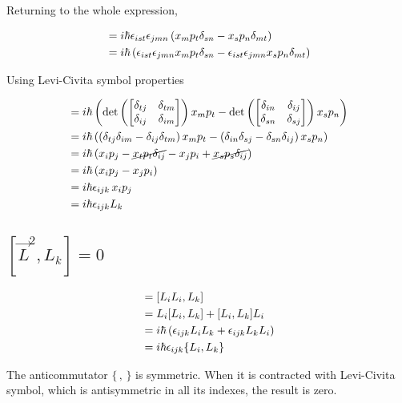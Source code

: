 Returning to the whole expression,   

\begin{align}
	[L_i,L_j] &=i\hbar\epsilon_{ist}\epsilon_{jmn} \paren{x_m p_t \delta_{sn} - x_s p_n \delta_{mt}} \\
		&=i\hbar \paren{\epsilon_{ist}\epsilon_{jmn}x_m p_t \delta_{sn} - \epsilon_{ist}\epsilon_{jmn}x_s p_n \delta_{mt}}
\end{align}

Using Levi-Civita symbol properties

\begin{align}
	[L_i,L_j] &= i\hbar\paren{\det\paren{\begin{bmatrix}
	\delta_{tj}&\delta_{tm}\\\delta_{ij}&\delta_{im}
	\end{bmatrix}}x_m p_t - \det\paren{\begin{bmatrix}
	\delta_{in}&\delta_{ij}\\\delta_{sn}&\delta_{sj}
	\end{bmatrix}}x_s p_n} \\
	&= i\hbar\paren{\paren{\delta_{tj}\delta_{im} - \delta_{ij}\delta_{tm}}x_m p_t - \paren{\delta_{in}\delta_{sj} - \delta_{sn}\delta_{ij}}x_sp_n} \\
	&= i\hbar \paren{x_i p_j - \cancel{x_tp_t\delta_{ij}} - x_jp_i + \cancel{x_s p_s\delta_{ij}}} \\
	&=  i\hbar \paren{x_i p_j -  x_jp_i } \\
	&= i\hbar \epsilon_{ijk} \,x_i p_j \\
	&= i\hbar\epsilon_{ijk}L_k
\end{align}

\subsection{$[\vec L^2,L_k] = 0$}

\begin{align}
	[\vec L^2,L_k] &= [L_i L_i,L_k] \\
		&= L_i[L_i,L_k] + [L_i,L_k]L_i \\
		&= i\hbar \paren{\epsilon_{ijk} L_i L_k + \epsilon_{ijk}L_k L_i} \\
		&= i\hbar\epsilon_{ijk}\{L_i,L_k\}
\end{align}

The anticommutator $\{\, ,\,\}$ is symmetric. When it is contracted with Levi-Civita symbol, which is antisymmetric in all its indexes, the result is zero. 


